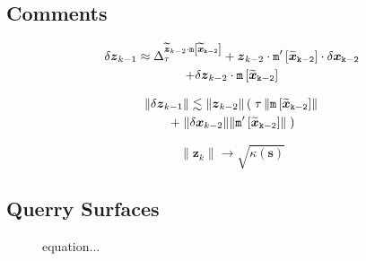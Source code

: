\documentclass[letterpaper,twocolumn,amsmath,amsfont,amssymb,english,aps,jcp,preprintnumbers,groupaddress,nofootinbib,tightenlines]{revtex4}
\newcommand{\mat}[1]{\boldsymbol{#1}}
\begin{document}
\subsection{Comments}

\begin{multline}
 \delta {\mat{z}}_{k-1} \approx \Delta^{\widetilde{\mat{z}}_{k-2} \cdot \tt{m}\left[ \widetilde{\mat{x}}_{k-2}\right]}_\tau 
+ \mat{z}_{k-2} \cdot \tt{m}'\left[ \widetilde{\mat{x}}_{k-2}\right] \cdot \delta \mat{x}_{k-2} \\
+\delta \mat{z}_{k-2} \cdot \tt{m} \left[\widetilde{\mat{x}}_{k-2} \right] 
\end{multline}

\begin{multline}
\lVert \delta {\mat{z}}_{k-1} \rVert \lesssim
\lVert \mat{z}_{k-2} \rVert \left( \;  \tau \, \lVert \tt{m} \left[\widetilde{\mat{x}}_{k-2} \right]  \rVert \right.   \\ \left.
+ \; \lVert \delta {\mat{x}}_{k-2} \rVert   \lVert \tt{m}' \left[\widetilde{\mat{x}}_{k-2} \right] \rVert \; \right)
\end{multline}

\begin{equation}
\lVert \mat{z}_{k} \rVert  \rightarrow \sqrt{\kappa\left(\mat{s} \right)}
\end{equation}

\subsection{Querry Surfaces}

\begin{figure}[h]
  \caption{equation...}
\end{figure}
\end{document}
